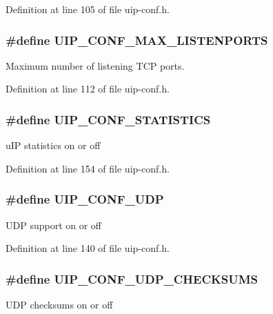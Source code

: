 Definition at line 105 of file uip-\/conf.h.

\hypertarget{group__uipfw_ga974c9b4bbe6b07cc1d64ac4fad278030}{
\subsubsection[{UIP\_\-CONF\_\-MAX\_\-LISTENPORTS}]{\setlength{\rightskip}{0pt plus 5cm}\#define UIP\_\-CONF\_\-MAX\_\-LISTENPORTS}}
\label{group__uipfw_ga974c9b4bbe6b07cc1d64ac4fad278030}
Maximum number of listening TCP ports. 

Definition at line 112 of file uip-\/conf.h.

\hypertarget{group__uipfw_ga529648ad3b0b327a43689b0f1779ff55}{
\subsubsection[{UIP\_\-CONF\_\-STATISTICS}]{\setlength{\rightskip}{0pt plus 5cm}\#define UIP\_\-CONF\_\-STATISTICS}}
\label{group__uipfw_ga529648ad3b0b327a43689b0f1779ff55}
uIP statistics on or off 

Definition at line 154 of file uip-\/conf.h.

\hypertarget{group__uipfw_ga763f12007aad8cc0e483bf50f8a8d9b4}{
\subsubsection[{UIP\_\-CONF\_\-UDP}]{\setlength{\rightskip}{0pt plus 5cm}\#define UIP\_\-CONF\_\-UDP}}
\label{group__uipfw_ga763f12007aad8cc0e483bf50f8a8d9b4}
UDP support on or off 

Definition at line 140 of file uip-\/conf.h.

\hypertarget{group__uipfw_ga9dd44616d41cef74d3beb51d8be5ecec}{
\subsubsection[{UIP\_\-CONF\_\-UDP\_\-CHECKSUMS}]{\setlength{\rightskip}{0pt plus 5cm}\#define UIP\_\-CONF\_\-UDP\_\-CHECKSUMS}}
\label{group__uipfw_ga9dd44616d41cef74d3beb51d8be5ecec}
UDP checksums on or off 

